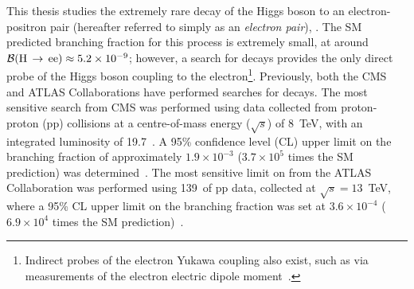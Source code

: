 

This thesis studies the extremely rare decay of the Higgs boson to an electron-positron pair (hereafter referred to simply as an \textit{electron pair}), \Hee. The SM predicted branching fraction for this process is extremely small, at around $\mathcal{B}(\mathrm{H}\,\rightarrow\,\mathrm{ee}) \approx 5.2\times10^{-9}$; however, a search for \Hee decays provides the only direct probe of the Higgs boson coupling to the electron\footnote{Indirect probes of the electron Yukawa coupling also exist, such as via measurements of the electron electric dipole moment~\cite{ACME}.}. Previously, both the CMS and ATLAS Collaborations have performed searches for \Hee decays. The most sensitive search from CMS was performed using data collected from proton-proton (pp) collisions at a centre-of-mass energy ($\sqrt{s}$) of 8~TeV, with an integrated luminosity of 19.7~\fbinv. A 95\% confidence level (CL) upper limit on the \Hee branching fraction of approximately $1.9\times10^{-3}$ ($3.7 \times 10^{5}$ times the SM prediction) was determined~\cite{CMSHeeRun1}. The most sensitive limit on \BHee from the ATLAS Collaboration was performed using 139~\fbinv of pp data, collected at $\sqrt{s}=13$~TeV, where a 95\% CL upper limit on the branching fraction was set at $3.6\times10^{-4}$ ($6.9 \times 10^{4}$ times the SM prediction)~\cite{ATLASHeeRun2}.

